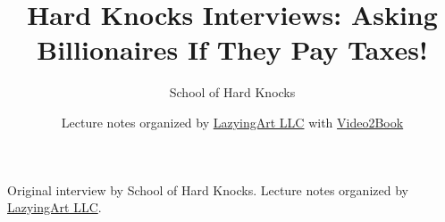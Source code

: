 \documentclass[11pt,oneside]{book}
\begin{document}
\frontmatter
\title{Hard Knocks Interviews: Asking Billionaires If They Pay Taxes!}
\author{School of Hard Knocks}
\date{Lecture notes organized by \href{https://lazying.art}{LazyingArt LLC} with \href{https://github.com/lachlanchen/Video2Book}{Video2Book}}
\maketitle
\begin{center}
\small Original interview by School of Hard Knocks. Lecture notes organized by \href{https://lazying.art}{LazyingArt LLC}.
\end{center}
\clearpage
\mainmatter

\end{document}

